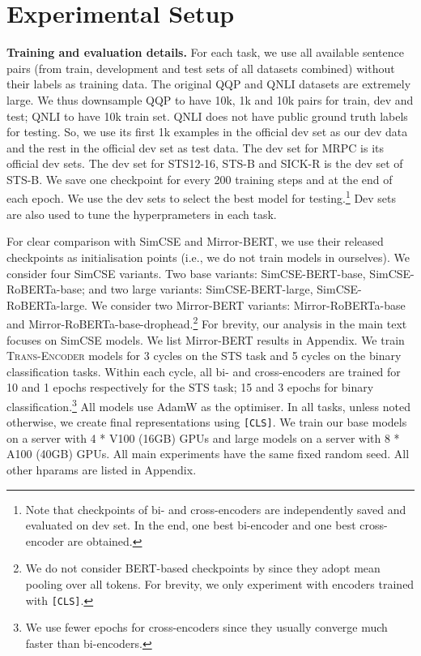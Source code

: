 \documentclass{article} \usepackage{iclr2021_conference,times}
\newcommand{\modelname}{\textsc{Trans-Encoder}\xspace}
\begin{document}
\section{Experimental Setup}


\textbf{Training and evaluation details.}
For each task, we use all available sentence pairs (from train, development and test sets of all datasets combined) without their labels as training data. 
The original QQP and QNLI datasets are extremely large. 
We thus downsample QQP to have 10k, 1k and 10k pairs for train, dev and test; QNLI to have 10k train set. 
QNLI does not have public ground truth labels for testing. 
So, we use its first 1k examples in the official dev set as our dev data and the rest in the official dev set as test data. 
The dev set for MRPC is its official dev sets. The dev set for STS12-16, STS-B and SICK-R is the dev set of STS-B. 
We save one checkpoint for every 200 training steps and at the end of each epoch. We use the dev sets to select the best model for testing.\footnote{Note that checkpoints of bi- and cross-encoders are independently saved and evaluated on dev set. In the end, one best bi-encoder and one best cross-encoder are obtained.}
Dev sets are also used to tune the hyperprameters in each task.

For clear comparison with SimCSE and Mirror-BERT, we use their released checkpoints as initialisation points (i.e., we do not train models in  ourselves). 
We consider four SimCSE variants. Two base variants: SimCSE-BERT-base, SimCSE-RoBERTa-base; and two large variants: SimCSE-BERT-large, SimCSE-RoBERTa-large. We consider two Mirror-BERT variants: Mirror-RoBERTa-base and Mirror-RoBERTa-base-drophead.\footnote{We do not consider BERT-based checkpoints by \citet{liu2021fast} since they adopt mean pooling over all tokens. For brevity, we only experiment with encoders trained with \texttt{[CLS]}.} For brevity, our analysis in the main text focuses on SimCSE models. We list Mirror-BERT results in Appendix.
We train \modelname models for 3 cycles on the STS task and 5 cycles on the binary classification tasks. 
Within each cycle, all bi- and cross-encoders are trained for 10 and 1 epochs respectively for the STS task; 15 and 3 epochs for binary classification.\footnote{We use fewer epochs for cross-encoders since they usually converge much faster than bi-encoders.} 
All models use AdamW \citep{loshchilov2018decoupled} as the optimiser. 
In all tasks, unless noted otherwise, we create final representations using \texttt{[CLS]}. We train our base models on a server with 4 * V100 (16GB) GPUs and large models on a server with 8 * A100 (40GB) GPUs. All main experiments have the same fixed random seed. All other hparams are listed in Appendix.
\end{document}
